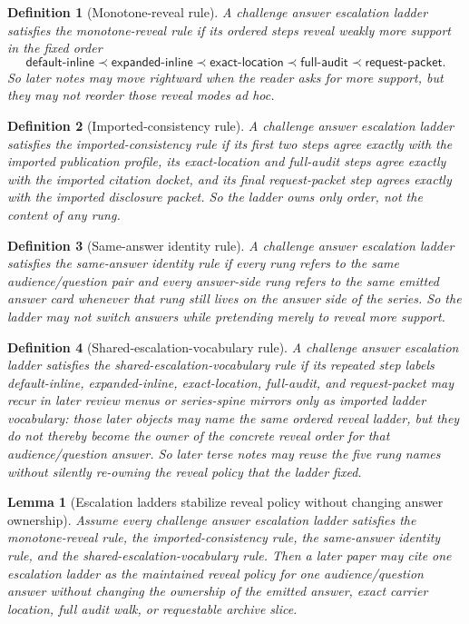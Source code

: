 \documentclass[11pt]{article}
\newtheorem{definition}{Definition}
\newtheorem{lemma}{Lemma}
\begin{document}
\begin{definition}[Monotone-reveal rule]
A challenge answer escalation ladder satisfies the \emph{monotone-reveal rule} if its ordered steps reveal weakly more support in the fixed order
\[
\textsf{default-inline} \prec \textsf{expanded-inline} \prec \textsf{exact-location} \prec \textsf{full-audit} \prec \textsf{request-packet}.
\]
So later notes may move rightward when the reader asks for more support, but they may not reorder those reveal modes ad hoc.
\end{definition}

\begin{definition}[Imported-consistency rule]
A challenge answer escalation ladder satisfies the \emph{imported-consistency rule} if its first two steps agree exactly with the imported publication profile, its exact-location and full-audit steps agree exactly with the imported citation docket, and its final request-packet step agrees exactly with the imported disclosure packet.
So the ladder owns only order, not the content of any rung.
\end{definition}

\begin{definition}[Same-answer identity rule]
A challenge answer escalation ladder satisfies the \emph{same-answer identity rule} if every rung refers to the same audience/question pair and every answer-side rung refers to the same emitted answer card whenever that rung still lives on the answer side of the series.
So the ladder may not switch answers while pretending merely to reveal more support.
\end{definition}

\begin{definition}[Shared-escalation-vocabulary rule]
A challenge answer escalation ladder satisfies the \emph{shared-escalation-vocabulary rule} if its repeated step labels \textsf{default-inline}, \textsf{expanded-inline}, \textsf{exact-location}, \textsf{full-audit}, and \textsf{request-packet} may recur in later review menus or series-spine mirrors only as imported ladder vocabulary: those later objects may name the same ordered reveal ladder, but they do not thereby become the owner of the concrete reveal order for that audience/question answer.
So later terse notes may reuse the five rung names without silently re-owning the reveal policy that the ladder fixed.
\end{definition}

\begin{lemma}[Escalation ladders stabilize reveal policy without changing answer ownership]
Assume every challenge answer escalation ladder satisfies the monotone-reveal rule, the imported-consistency rule, the same-answer identity rule, and the shared-escalation-vocabulary rule.
Then a later paper may cite one escalation ladder as the maintained reveal policy for one audience/question answer without changing the ownership of the emitted answer, exact carrier location, full audit walk, or requestable archive slice.
\end{lemma}
\end{document}
